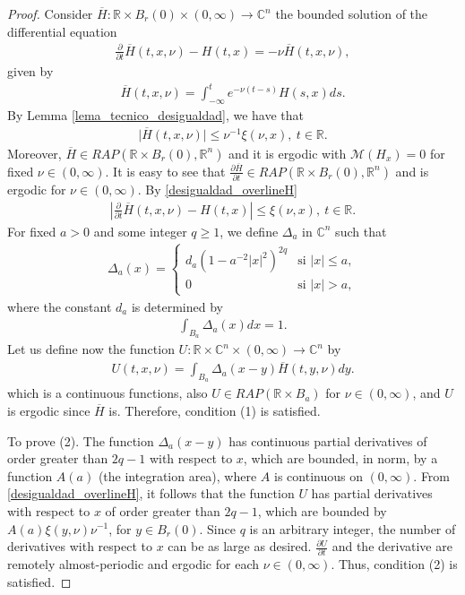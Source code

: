 \documentclass[english,reqno]{amsart}
\numberwithin{equation}{section}
\theoremstyle{plain}
\theoremstyle{definition}
\theoremstyle{remark}
\newcommand{\bb}[1]{{\mathbb{#1}}}
\begin{document}
\begin{proof}
Consider $\overline{H}:\bb{R}\times B_{r}(0) \times (0,\infty)\rightarrow\bb{C}^n$ the bounded solution of the differential equation
\begin{eqnarray*}
\frac{\partial}{\partial t} \overline{H}(t,x,\nu)-H(t,x)=-\nu \overline{H}(t,x,\nu),
\end{eqnarray*}
given by
\begin{eqnarray*}
\overline{H}(t,x,\nu)=\int_{-\infty}^{t}e^{-\nu (t-s)}H(s,x)ds.
\end{eqnarray*}
By Lemma \ref{lema_tecnico_desigualdad}, we have that
\begin{eqnarray}
\vert \overline{H}(t,x,\nu) \vert\leq \nu^{-1}\xi(\nu,x),\ t\in\bb{R}. \label{desigualdad_overlineH}
\end{eqnarray}
Moreover, $\overline{H} \in RAP(\mathbb{R}\times B_{r}(0),\mathbb{R}^n)$ and it is ergodic with $\mathcal{M}(H_x)=0$ for fixed $\nu\in(0,\infty)$.  
It is easy to see that $\frac{\partial \overline{H}}{\partial t} \in RAP(\mathbb{R}\times B_{r}(0),\mathbb{R}^n)$ and is ergodic for $\nu\in (0,\infty)$.  
By \eqref{desigualdad_overlineH}
\begin{eqnarray*}
\left\vert \frac{\partial}{\partial t} \overline{H}(t,x,\nu)-H(t,x) \right\vert \leq \xi(\nu,x), \ t\in \bb{R}.
\end{eqnarray*}
For fixed $a>0$ and some integer $q\geq 1$, we define $\Delta_a$ in $\mathbb{C}^n$ such that
\begin{eqnarray*}
\Delta_{a}(x)=\begin{cases}
d_{a}(1-a^{-2}\left|x\right|^{2})^{2q} & \mbox{si }\left|x\right|\leq a,\\
0 & \mbox{si }\left|x\right|>a,
\end{cases}
\end{eqnarray*}
where the constant $d_a$ is determined by
\begin{eqnarray*}
\int_{B_{a}} \Delta_a (x)dx=1.
\end{eqnarray*}
Let us define now the function $U:\bb{R}\times\bb{C}^n\times(0,\infty)\rightarrow\bb{C}^n$ by
\begin{eqnarray*}
U(t,x,\nu)=\int_{B_{a}} \Delta_a(x-y)\overline{H}(t,y,\nu)dy.
\end{eqnarray*}
which is a continuous functions, also %
$U \in RAP(\mathbb{R}\times B_{a})$ for $\nu\in(0,\infty)$, and $U$ is ergodic since $\overline{H}$ is. Therefore, condition (1) is satisfied.

To prove (2). The function $\Delta_a(x - y)$ has continuous partial derivatives of order greater than $2q - 1$ with respect to $x$, which are bounded, in norm, by a function $A(a)$ (the integration area), where $A$ is continuous on $(0,\infty)$.  
From \eqref{desigualdad_overlineH}, it follows that the function $U$ has partial derivatives with respect to $x$ of order greater than $2q - 1$, which are bounded by $A(a)\xi(y,\nu)\nu^{-1}$, for $y\in B_r(0)$.  
Since $q$ is an arbitrary integer, the number of derivatives with respect to $x$ can be as large as desired.  
$\frac{\partial U}{\partial t}$ and the derivative are remotely almost-periodic and ergodic for each $\nu\in(0,\infty)$.  
Thus, condition (2) is satisfied.


\end{proof}
\end{document}
